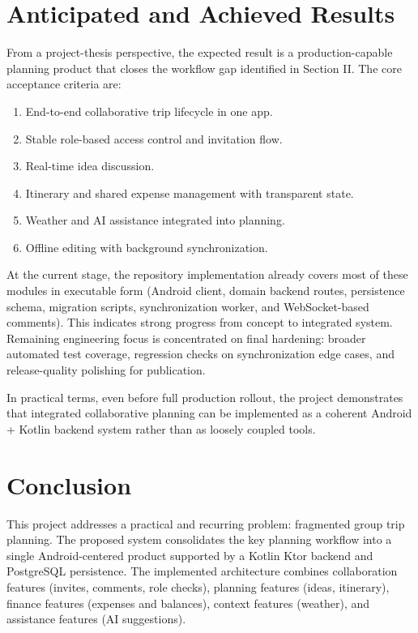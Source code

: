 \documentclass[10pt,twocolumn]{article}
\begin{document}
\section{Anticipated and Achieved Results}

From a project-thesis perspective, the expected result is a production-capable planning product that closes the workflow gap identified in Section II. The core acceptance criteria are:
\begin{enumerate}
\item End-to-end collaborative trip lifecycle in one app.
\item Stable role-based access control and invitation flow.
\item Real-time idea discussion.
\item Itinerary and shared expense management with transparent state.
\item Weather and AI assistance integrated into planning.
\item Offline editing with background synchronization.
\end{enumerate}

At the current stage, the repository implementation already covers most of these modules in executable form (Android client, domain backend routes, persistence schema, migration scripts, synchronization worker, and WebSocket-based comments). This indicates strong progress from concept to integrated system. Remaining engineering focus is concentrated on final hardening: broader automated test coverage, regression checks on synchronization edge cases, and release-quality polishing for publication.

In practical terms, even before full production rollout, the project demonstrates that integrated collaborative planning can be implemented as a coherent Android + Kotlin backend system rather than as loosely coupled tools.

\section{Conclusion}

This project addresses a practical and recurring problem: fragmented group trip planning. The proposed system consolidates the key planning workflow into a single Android-centered product supported by a Kotlin Ktor backend and PostgreSQL persistence. The implemented architecture combines collaboration features (invites, comments, role checks), planning features (ideas, itinerary), finance features (expenses and balances), context features (weather), and assistance features (AI suggestions).
\end{document}
